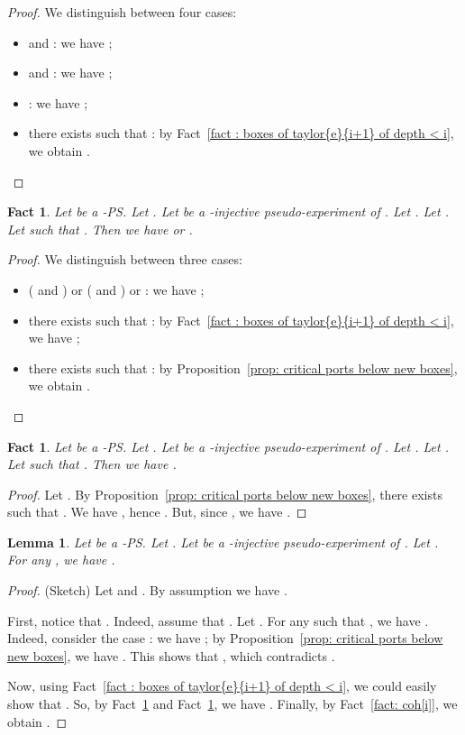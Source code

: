\documentclass{article}
\theoremstyle{plain}
\newtheorem{lem}[theorem]{Lemma}
\newtheorem{fact}[theorem]{Fact}
\begin{document}
\begin{proof}
We distinguish between four cases:
\begin{itemize}
\item  and : we have ;
\item  and : we have ;
\item : we have ;
\item there exists  such that : by Fact~\ref{fact : boxes of taylor{e}{i+1} of depth < i}, we obtain .
\end{itemize}
\end{proof}

\begin{fact}\label{fact: coh[i+1]}
Let  be a -PS. Let . 
Let  be a -injective pseudo-experiment of . Let . 
Let . 
Let  such that .
 Then we have  or .
\end{fact}

\begin{proof}
We distinguish between three cases:
\begin{itemize}
\item ( and ) or ( and ) or : we have ;
\item there exists  such that : by  Fact~\ref{fact : boxes of taylor{e}{i+1} of depth < i}, we have ;
\item there exists  such that : by  Proposition~\ref{prop: critical ports below new boxes}, we obtain .
\end{itemize}
\end{proof}

\begin{fact}\label{fact: critical ports for M => crtical ports for j}
Let  be a -PS. Let . 
Let  be a -injective pseudo-experiment of . Let . Let . Let  such that . Then we have .
\end{fact}

\begin{proof}
Let . By Proposition~\ref{prop: critical ports below new boxes}, there exists  such that . We have , hence . But, since , we have .
\end{proof}

\begin{lem}\label{lem: second condition}
Let  be a -PS. Let . 
Let  be a -injective pseudo-experiment of . Let . 
For any , we have .
\end{lem}

\begin{proof}
(Sketch) 
Let  and . 
By assumption we have .

First, notice that . Indeed, assume that . Let . For any  such that , we have . Indeed, consider the case : we have ; by Proposition~\ref{prop: critical ports below new boxes}, we have . This shows that , which contradicts . 

Now, using Fact~\ref{fact : boxes of taylor{e}{i+1} of depth < i}, we could easily show that . 
So, by Fact~\ref{fact: coh[i+1]} and Fact~\ref{fact: critical ports for M => crtical ports for j}, we have . 
Finally, by Fact~\ref{fact: coh[i]}, we obtain .
\end{proof}
\end{document}
